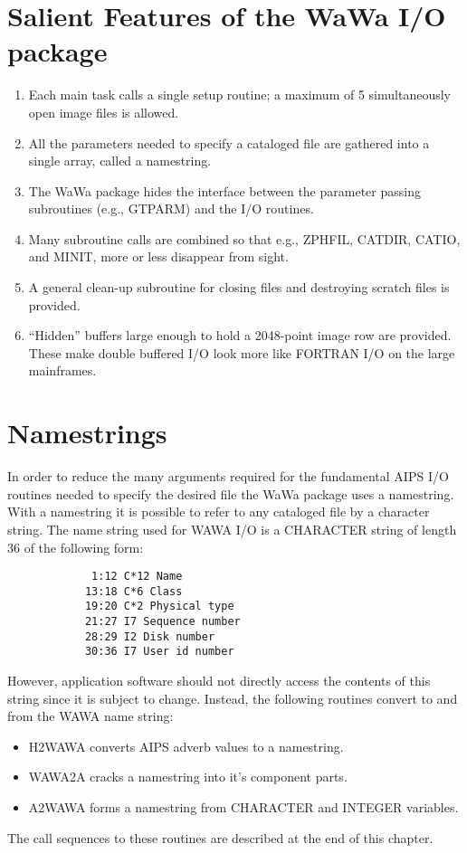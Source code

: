 \section{Salient Features of the WaWa I/O package}
\begin{enumerate} %
\item Each main task calls a single setup routine; a maximum of 5
simultaneously open image files is allowed.
\item All the parameters needed to specify a cataloged file are gathered
into a single array, called a namestring.
\item The WaWa package hides the interface between the parameter passing
subroutines (e.g., GTPARM) and the I/O routines.
\item Many subroutine calls are combined so that e.g., ZPHFIL, CATDIR,
CATIO, and MINIT, more or less disappear from sight.
\item A general clean-up subroutine for closing files and destroying scratch
files is provided.
\item ``Hidden'' buffers large enough to hold a 2048-point image row are
provided.  These make double buffered I/O look more like FORTRAN I/O
on the large mainframes.

\end{enumerate} %

\section{Namestrings}
In order to reduce the many arguments required for the fundamental
AIPS I/O routines needed to specify the desired file the WaWa package
uses a namestring.  With a namestring it is possible to refer to any
cataloged file by a character string.
The name string used for WAWA I/O is a CHARACTER string of length 36
of the following form:
\begin{verbatim}
             1:12 C*12 Name
            13:18 C*6 Class
            19:20 C*2 Physical type
            21:27 I7 Sequence number
            28:29 I2 Disk number
            30:36 I7 User id number
\end{verbatim}

However, application software should not directly access the
contents of this string since it is subject to change.  Instead, the
following routines convert to and from the WAWA name string:
\begin{itemize} %
\item H2WAWA converts AIPS adverb values to a namestring.
\item WAWA2A cracks a namestring into it's component parts.
\item A2WAWA forms a namestring from CHARACTER and INTEGER variables.
\end{itemize} %
The call sequences to these routines are described at the end of this
chapter.


